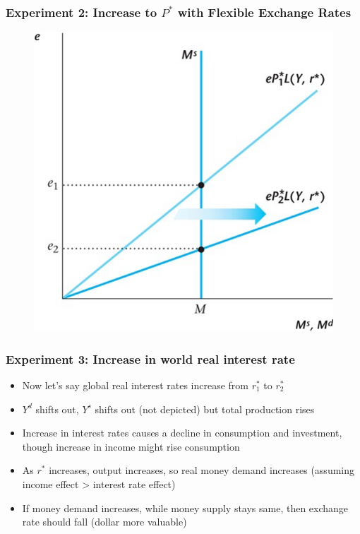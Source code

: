 \documentclass{beamer}
\begin{document}
\begin{frame}
\frametitle[alignment=center]{Experiment 2: Increase to $P^*$ with Flexible Exchange Rates}
\begin{figure}
\centering
\includegraphics[scale=0.75]{Figures/W_Fig_17pt5.png}
\end{figure}
\end{frame}

\begin{frame}
\frametitle[alignment=center]{Experiment 3: Increase in world real interest rate}
\begin{itemize}
\item Now let's say global real interest rates increase from $r_1^*$ to $r_2^*$
\bigskip
\item $Y^d$ shifts out, $Y^s$ shifts out (not depicted) but total production rises
\bigskip
\item Increase in interest rates causes a decline in consumption and investment, though increase in income might rise consumption
\bigskip
\item As $r^*$ increases, output increases, so real money demand increases (assuming income effect > interest rate effect)
\bigskip
\item If money demand increases, while money supply stays same, then exchange rate should fall (dollar more valuable)
\end{itemize}
\end{frame}
\end{document}

